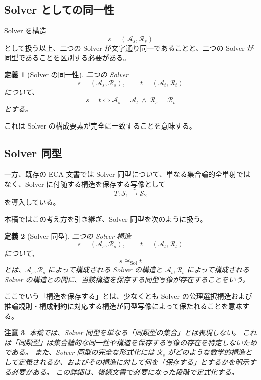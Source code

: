 \documentclass[a4paper,11pt]{article}
\newtheorem{definition}{定義}[section]
\newtheorem{remark}[definition]{注意}
\newcommand{\Solver}{\mathcal{S}}
\begin{document}
\subsection{Solver としての同一性}

Solver を構造
\[
s=(\mathcal{A}_s,\mathcal{R}_s)
\]
として扱う以上、二つの Solver が文字通り同一であることと、二つの Solver が同型であることを区別する必要がある。

\begin{definition}[Solver の同一性]
二つの Solver
\[
s=(\mathcal{A}_s,\mathcal{R}_s),
\qquad
t=(\mathcal{A}_t,\mathcal{R}_t)
\]
について、
\[
\boxed{
s=t
\iff
\mathcal{A}_s=\mathcal{A}_t
\ \land\
\mathcal{R}_s=\mathcal{R}_t
}
\]
とする。
\end{definition}

これは Solver の構成要素が完全に一致することを意味する。

\subsection{Solver 同型}

一方、既存の ECA 文書では Solver 同型について、単なる集合論的全単射ではなく、Solver に付随する構造を保存する写像として
\[
T:\Solver_1\overset{\sim}{\longrightarrow}\Solver_2
\]
を導入している。

本稿ではこの考え方を引き継ぎ、Solver 同型を次のように扱う。

\begin{definition}[Solver 同型]
二つの Solver 構造
\[
s=(\mathcal{A}_s,\mathcal{R}_s),
\qquad
t=(\mathcal{A}_t,\mathcal{R}_t)
\]
について、
\[
\boxed{
s\cong_{\mathrm{Sol}}t
}
\]
とは、$\mathcal{A}_s,\mathcal{R}_s$ によって構成される Solver の構造と $\mathcal{A}_t,\mathcal{R}_t$ によって構成される Solver の構造との間に、当該構造を保存する同型写像が存在することをいう。
\end{definition}

ここでいう「構造を保存する」とは、少なくとも Solver の公理選択構造および推論規則・構成制約に対応する構造が同型写像によって保たれることを意味する。

\begin{remark}
本稿では、Solver 同型を単なる「同類型の集合」とは表現しない。
これは「同類型」は集合論的な同一性や構造を保存する写像の存在を特定しないためである。
また、Solver 同型の完全な形式化には $\mathcal{R}_s$ がどのような数学的構造として定義されるか、およびその構造に対して何を「保存する」とするかを明示する必要がある。
この詳細は、後続文書で必要になった段階で定式化する。
\end{remark}
\end{document}
